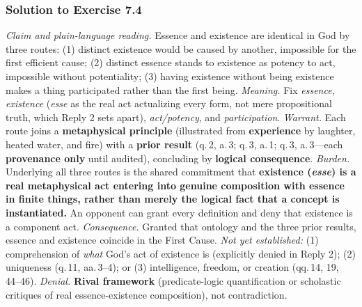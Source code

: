 \subsubsection*{Solution to Exercise 7.4}
\emph{Claim and plain-language reading.} Essence and existence are identical in God by three routes: (1) distinct existence would be caused by another, impossible for the first efficient cause; (2) distinct essence stands to existence as potency to act, impossible without potentiality; (3) having existence without being existence makes a thing participated rather than the first being. \emph{Meaning.} Fix \emph{essence}, \emph{existence} (\emph{esse} as the real act actualizing every form, not mere propositional truth, which Reply 2 sets apart), \emph{act/potency}, and \emph{participation}. \emph{Warrant.} Each route joins a \textbf{metaphysical principle} (illustrated from \textbf{experience} by laughter, heated water, and fire) with a \textbf{prior result} (q.\,2, a.\,3; q.\,3, a.\,1; q.\,3, a.\,3---each \textbf{provenance only} until audited), concluding by \textbf{logical consequence}. \emph{Burden.} Underlying all three routes is the shared commitment that \textbf{existence (\emph{esse}) is a real metaphysical act entering into genuine composition with essence in finite things, rather than merely the logical fact that a concept is instantiated.} An opponent can grant every definition and deny that existence is a component act. \emph{Consequence.} Granted that ontology and the three prior results, essence and existence coincide in the First Cause. \emph{Not yet established:} (1) comprehension of \emph{what} God's act of existence is (explicitly denied in Reply 2); (2) uniqueness (q.\,11, aa.\,3--4); or (3) intelligence, freedom, or creation (qq.\,14, 19, 44--46). \emph{Denial.} \textbf{Rival framework} (predicate-logic quantification or scholastic critiques of real essence-existence composition), not contradiction.

